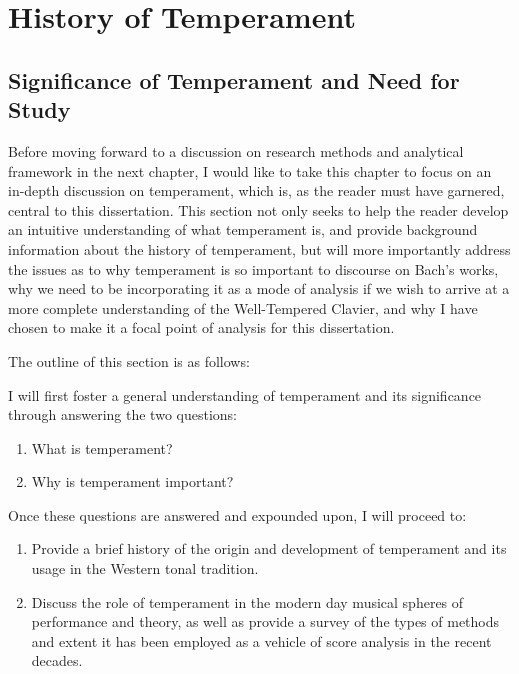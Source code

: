     
    
    

    \hypertarget{History of Temperament}{\chapter{History of Temperament}\label{History of Temperament}}
    \section{Significance of Temperament and Need for
Study}\label{significance-of-temperament-and-need-for-study}

Before moving forward to a discussion on research methods and analytical
framework in the next chapter, I would like to take this chapter to
focus on an in-depth discussion on temperament, which is, as the reader
must have garnered, central to this dissertation. This section not only
seeks to help the reader develop an intuitive understanding of what
temperament is, and provide background information about the history of
temperament, but will more importantly address the issues as to why
temperament is so important to discourse on Bach's works, why we need to
be incorporating it as a mode of analysis if we wish to arrive at a more
complete understanding of the Well-Tempered Clavier, and why I have
chosen to make it a focal point of analysis for this dissertation.

The outline of this section is as follows:

I will first foster a general understanding of temperament and its
significance through answering the two questions:

\begin{enumerate}
\def\labelenumi{\arabic{enumi}.}
\tightlist
\item
  What is temperament?
\item
  Why is temperament important?
\end{enumerate}

Once these questions are answered and expounded upon, I will proceed to:

\begin{enumerate}
\def\labelenumi{\arabic{enumi}.}
\setcounter{enumi}{2}
\tightlist
\item
  Provide a brief history of the origin and development of temperament
  and its usage in the Western tonal tradition.
\item
  Discuss the role of temperament in the modern day musical spheres of
  performance and theory, as well as provide a survey of the types of
  methods and extent it has been employed as a vehicle of score analysis
  in the recent decades.
\end{enumerate}

